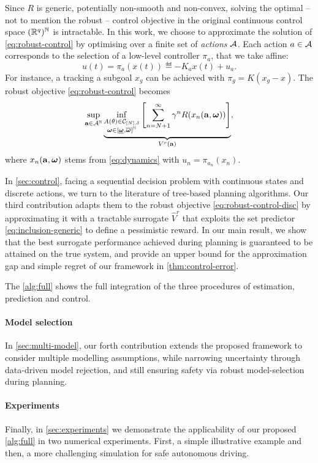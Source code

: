 \documentclass{article}
\begin{document}
Since $R$ is generic, potentially non-smooth and non-convex, solving the optimal -- not to mention the robust -- control objective in the original continuous control space $(\mathbb{R}^q)^{\mathbb{N}}$ is intractable.
In this work, we choose to approximate the solution of \eqref{eq:robust-control} by optimising over a finite set of \emph{actions} $\mathcal{A}$. Each action $a\in\mathcal{A}$ corresponds to the selection of a low-level controller $\pi_a$, that we take affine:
\[u(t) = \pi_a(x(t)) \eqdef -K_a x(t) + u_a.\]
For instance, a tracking a subgoal $x_g$ can be achieved with $\pi_g = K(x_g - x)$. The robust objective \eqref{eq:robust-control} becomes 
\begin{equation}
\label{eq:robust-control-disc}
\sup_{\mathbf{a}\in{\mathcal{A}}^{\mathbb{N}}} \underbrace{\inf_{\substack{A(\theta) \in \mathcal{C}_{[N],\delta} \\ \bm{\omega}\in[\underline{\bm{\omega}},\overline{\bm{\omega}}]^{\mathbb{N}}}} \left[\sum_{n=N+1}^\infty \gamma^n R(x_n(\mathbf{a},\bm{\omega}))\right]}_{V^r(\mathbf{a})},
\end{equation}
where $x_n(\mathbf{a}, \bm{\omega})$ stems from \eqref{eq:dynamics} with $u_n = \pi_{a_n}(x_n)$.

In \autoref{sec:control}, facing a sequential decision problem with continuous states and discrete actions, we turn to the literature of tree-based planning algorithms. Our third contribution adapts them to the robust objective \eqref{eq:robust-control-disc} by approximating it with a tractable surrogate $\hat{V}^r$ that exploits the set predictor \eqref{eq:inclusion-generic} to define a pessimistic reward. In our main result, we show that the best surrogate performance achieved during planning is guaranteed to be attained on the true system, and provide an upper bound for the approximation gap and simple regret of our framework in \autoref{thm:control-error}.

The \autoref{alg:full} shows the full integration of the three procedures of estimation, prediction and control. 

\paragraph{Model selection} In \autoref{sec:multi-model}, our forth contribution extends the proposed framework to consider multiple modelling assumptions, while narrowing uncertainty through data-driven model rejection, and still ensuring safety via robust model-selection during planning.

\paragraph{Experiments} Finally, in \autoref{sec:experiments} we demonstrate the applicability of our proposed \autoref{alg:full} in two numerical experiments. First, a simple illustrative example and then, a more challenging simulation for safe autonomous driving.
\end{document}
